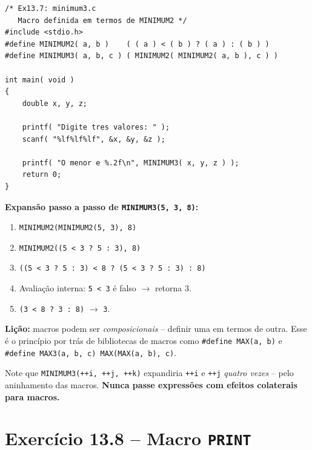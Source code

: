 \documentclass[12pt,a4paper]{article}
\begin{document}
\begin{respostabox}
\begin{lstlisting}
/* Ex13.7: minimum3.c
   Macro definida em termos de MINIMUM2 */
#include <stdio.h>
#define MINIMUM2( a, b )    ( ( a ) < ( b ) ? ( a ) : ( b ) )
#define MINIMUM3( a, b, c ) ( MINIMUM2( MINIMUM2( a, b ), c ) )

int main( void )
{
    double x, y, z;

    printf( "Digite tres valores: " );
    scanf( "%lf%lf%lf", &x, &y, &z );

    printf( "O menor e %.2f\n", MINIMUM3( x, y, z ) );
    return 0;
}
\end{lstlisting}

\textbf{Expansão passo a passo de \texttt{MINIMUM3(5, 3, 8)}:}
\begin{enumerate}[noitemsep]
  \item \texttt{MINIMUM2(MINIMUM2(5, 3), 8)}
  \item \texttt{MINIMUM2((5 < 3 ? 5 : 3), 8)}
  \item \texttt{((5 < 3 ? 5 : 3) < 8 ? (5 < 3 ? 5 : 3) : 8)}
  \item Avaliação interna: \texttt{5 < 3} é falso $\to$ retorna 3.
  \item \texttt{(3 < 8 ? 3 : 8)} $\to$ \texttt{3}.
\end{enumerate}

\textbf{Lição:} macros podem ser \textit{composicionais} -- definir uma em termos
de outra. Esse é o princípio por trás de bibliotecas de macros como
\texttt{\#define MAX(a, b)} e \texttt{\#define MAX3(a, b, c) MAX(MAX(a, b), c)}.

\begin{boaprática}
  Note que \texttt{MINIMUM3(++i, ++j, ++k)} expandiria \texttt{++i} e \texttt{++j}
  \textit{quatro vezes} -- pelo aninhamento das macros. \textbf{Nunca passe expressões
  com efeitos colaterais para macros.}
\end{boaprática}
\end{respostabox}

\newpage

\section{Exercício 13.8 -- Macro \texttt{PRINT}}
\end{document}
